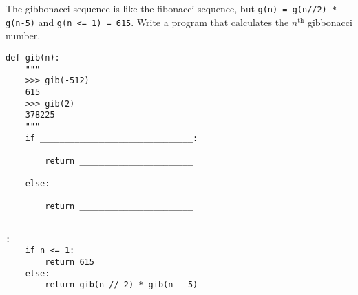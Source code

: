 \begin{blocksection}
\question The gibbonacci sequence is like the fibonacci sequence, but \texttt{g(n) = g(n//2) * g(n-5)} and \texttt{g(n <= 1) = 615}. Write a program that calculates the $n^{\text{th}}$ gibbonacci number. \\

\begin{lstlisting}
def gib(n):
    """
    >>> gib(-512)
    615
    >>> gib(2)
    378225
    """
    if _______________________________:

        return _______________________

    else:

        return _______________________


\end{lstlisting}

\begin{solution}[1in]
\begin{lstlisting}:
    if n <= 1:
        return 615
    else:
        return gib(n // 2) * gib(n - 5)
\end{lstlisting}
\end{solution}
\end{blocksection}
